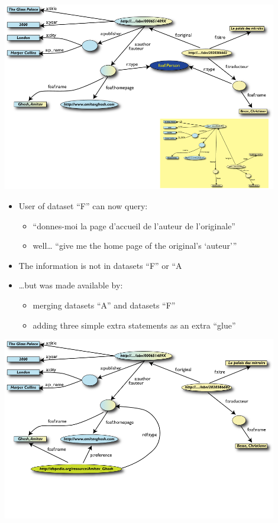 \documentclass[a4paper,landscape,headrule,footrule,xetex]{foils}
\begin{document}
\noindent
\includegraphics[width=0.9\textwidth]{../pics/img25.png}


\begin{itemize}
\item User of dataset ``F'' can now query:
  \begin{itemize}
  \item ``donnes-moi la page d’accueil de l’auteur de l’originale''
  \item well… ``give me the home page of the original’s ‘auteur’''
  \end{itemize}
\item The information is not in datasets ``F'' or ``A
\item \ldots but was made available by:
  \begin{itemize}
  \item merging datasets ``A'' and datasets ``F''
  \item adding three simple extra statements as an extra ``glue''
  \end{itemize}
\end{itemize}


\noindent
\includegraphics[width=0.9\textwidth]{../pics/img30.png}
\end{document}

